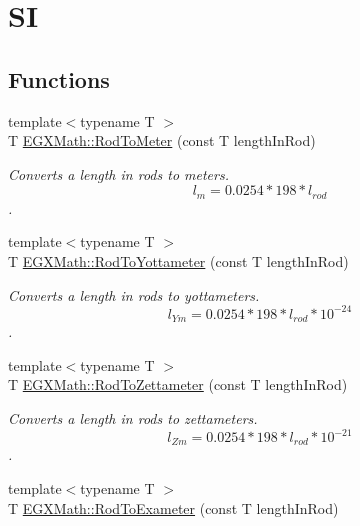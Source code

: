 \hypertarget{group___e_g_x_math-_conversions-_length_conversions-_imperial-_rod-_s_i}{}\section{SI}
\label{group___e_g_x_math-_conversions-_length_conversions-_imperial-_rod-_s_i}
\subsection*{Functions}
\begin{DoxyCompactItemize}
\item 
{\footnotesize template$<$typename T $>$ }\\T \mbox{\hyperlink{group___e_g_x_math-_conversions-_length_conversions-_imperial-_rod-_s_i_gabe33821aac19a508109735df98a1e74c}{E\+G\+X\+Math\+::\+Rod\+To\+Meter}} (const T length\+In\+Rod)
\begin{DoxyCompactList}\small\item\em Converts a length in rods to meters. \[ l_{m}=0.0254 * 198 * l_{rod} \]. \end{DoxyCompactList}\item 
{\footnotesize template$<$typename T $>$ }\\T \mbox{\hyperlink{group___e_g_x_math-_conversions-_length_conversions-_imperial-_rod-_s_i_ga0e3f1a816c8a67c7825b3b82ecf54b26}{E\+G\+X\+Math\+::\+Rod\+To\+Yottameter}} (const T length\+In\+Rod)
\begin{DoxyCompactList}\small\item\em Converts a length in rods to yottameters. \[ l_{Ym}=0.0254 * 198 * l_{rod} * 10^{-24} \]. \end{DoxyCompactList}\item 
{\footnotesize template$<$typename T $>$ }\\T \mbox{\hyperlink{group___e_g_x_math-_conversions-_length_conversions-_imperial-_rod-_s_i_gaccf39081a4e69ba4b9384ef6f9c354d7}{E\+G\+X\+Math\+::\+Rod\+To\+Zettameter}} (const T length\+In\+Rod)
\begin{DoxyCompactList}\small\item\em Converts a length in rods to zettameters. \[ l_{Zm}=0.0254 * 198 * l_{rod} * 10^{-21} \]. \end{DoxyCompactList}\item 
{\footnotesize template$<$typename T $>$ }\\T \mbox{\hyperlink{group___e_g_x_math-_conversions-_length_conversions-_imperial-_rod-_s_i_ga2e5ab24819c55373287494675f74f3a9}{E\+G\+X\+Math\+::\+Rod\+To\+Exameter}} (const T length\+In\+Rod)

\end{DoxyCompactItemize}
